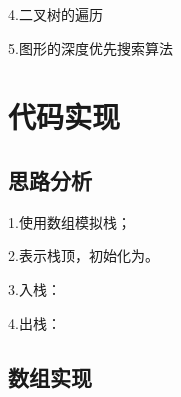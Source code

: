 \documentclass[a4paper]{report}
\begin{document}
4.二叉树的遍历

5.图形的深度优先搜索算法
\section{代码实现}
\subsection{思路分析}
1.使用数组模拟栈；

2.表示栈顶，初始化为。

3.入栈：

4.出栈：

\subsection{数组实现}
\end{document}
